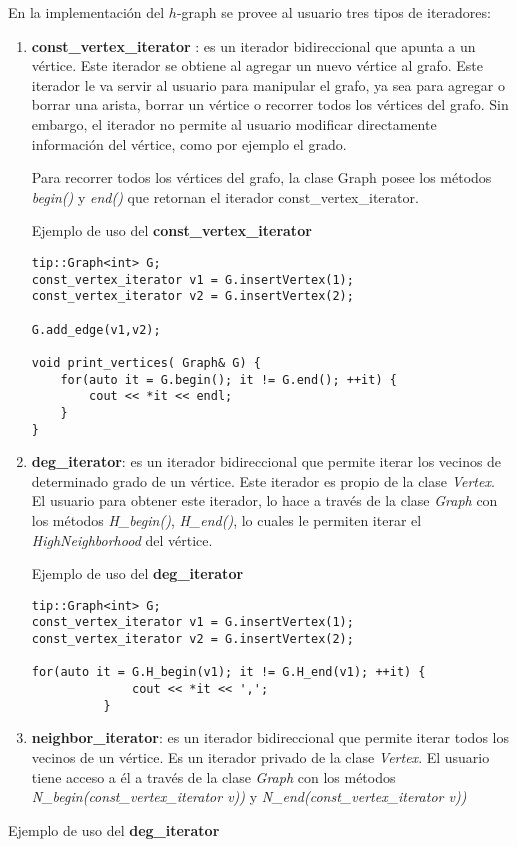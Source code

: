 \documentclass[a4paper,12pt]{article}
\begin{document}
En la implementación del $h$-graph se provee al usuario tres tipos de iteradores:

\begin{enumerate}
\item  \textbf{const\_vertex\_iterator} : es un iterador bidireccional que apunta a un vértice. Este iterador se obtiene al agregar un nuevo vértice al grafo. Este iterador le va servir al usuario para manipular el grafo, ya sea para agregar o borrar una arista, borrar un vértice o recorrer todos los vértices del grafo. Sin embargo, el iterador no permite al usuario modificar directamente información del vértice, como por ejemplo el grado.

Para recorrer todos los vértices del grafo, la clase Graph posee los métodos \textit{begin()} y \textit{end()} que retornan el iterador const\_vertex\_iterator.

Ejemplo de uso del \textbf{const\_vertex\_iterator}

\begin{lstlisting}[frame=single]
tip::Graph<int> G;
const_vertex_iterator v1 = G.insertVertex(1);
const_vertex_iterator v2 = G.insertVertex(2);

G.add_edge(v1,v2);

void print_vertices( Graph& G) {
    for(auto it = G.begin(); it != G.end(); ++it) {
        cout << *it << endl;
    }
}
\end{lstlisting}

\item \textbf{deg\_iterator}: es un iterador bidireccional que permite iterar los vecinos de determinado grado de un vértice. Este iterador es propio de la clase \textit{Vertex}. El usuario para obtener este iterador, lo hace a través de la clase \textit{Graph} con los métodos 
\textit{H\_begin()}, \textit{H\_end()}, lo cuales le permiten iterar el \textit{HighNeighborhood} del vértice.

Ejemplo de uso del \textbf{deg\_iterator}

\begin{lstlisting}[frame=single]
tip::Graph<int> G;
const_vertex_iterator v1 = G.insertVertex(1);
const_vertex_iterator v2 = G.insertVertex(2);

for(auto it = G.H_begin(v1); it != G.H_end(v1); ++it) {
              cout << *it << ',';
          }
\end{lstlisting}


\item \textbf{neighbor\_iterator}: es un iterador bidireccional que permite iterar todos los vecinos de un vértice. Es un iterador privado de la clase \textit{Vertex}. El usuario tiene acceso a él a través de la clase \textit{Graph} con los métodos \textit{N\_begin(const\_vertex\_iterator v))} y \textit{N\_end(const\_vertex\_iterator v))}
\end{enumerate}
			Ejemplo de uso del \textbf{deg\_iterator}
\end{document}
